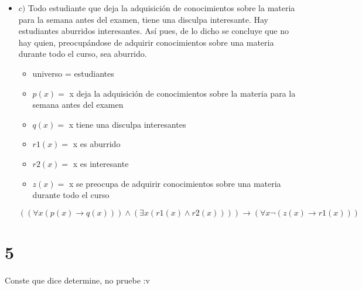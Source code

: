 \documentclass[12pt, fleqn]{article}                            %
\theoremstyle{break}                                            %
\newcommand \lLongTo {\longrightarrow}                          %
\begin{document}
\begin{itemize}
        \item $c)$
            Todo estudiante que deja la adquisición de conocimientos sobre la
            materia para la semana antes del examen, tiene una disculpa interesante.
            Hay estudiantes aburridos interesantes. Así pues, de lo dicho
            se concluye que no hay quien, preocupándose de adquirir conocimientos
            sobre una materia durante todo el curso, sea aburrido.

            \begin{itemize}
                \item universo = estudiantes
               \item $p(x) = $ x deja la adquisición de conocimientos sobre la
                                materia para la semana antes del examen
               \item $q(x) = $ x tiene una disculpa interesantes
               \item $r1(x) = $ x es aburrido
               \item $r2(x) = $ x es interesante
               \item $z(x) = $ x se preocupa de adquirir conocimientos
                                sobre una materia durante todo el curso
           \end{itemize}

           $
            (
               (
                    \forall x (
                        p(x) \lLongTo q(x)
                    )
               )
               \wedge
               (
                    \exists x (
                        r1(x) \wedge r2(x)
                    )
               )
            )
            \lLongTo
            (
                \forall x \neg (
                    z(x) \lLongTo r1(x)
                )
            )
           $
                
    \end{itemize}


\clearpage
\section{5}

    Conste que dice determine, no pruebe :v
\end{document}
